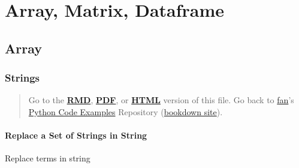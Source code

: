 \documentclass[
]{book}
\begin{document}
\hypertarget{array-matrix-dataframe}{%
\chapter{Array, Matrix, Dataframe}\label{array-matrix-dataframe}}

\hypertarget{array}{%
\section{Array}\label{array}}

\hypertarget{strings}{%
\subsection{Strings}\label{strings}}

\begin{quote}
Go to the \href{https://github.com/FanWangEcon//pyfan/blob/master/.//A-Collection-of-Python-Examples.Rmd}{\textbf{RMD}}, \href{https://github.com/FanWangEcon//pyfan/blob/master/.//htmlpdfr/A-Collection-of-Python-Examples.pdf}{\textbf{PDF}}, or \href{https://fanwangecon.github.io//pyfan/.//htmlpdfr/A-Collection-of-Python-Examples.html}{\textbf{HTML}} version of this file. Go back to \href{http://fanwangecon.github.io/}{fan}'s \href{https://fanwangecon.github.io/pyfan/}{Python Code Examples} Repository (\href{https://fanwangecon.github.io/pyfan/bookdown}{bookdown site}).
\end{quote}

\hypertarget{replace-a-set-of-strings-in-string}{%
\subsubsection{Replace a Set of Strings in String}\label{replace-a-set-of-strings-in-string}}

Replace terms in string
\end{document}
